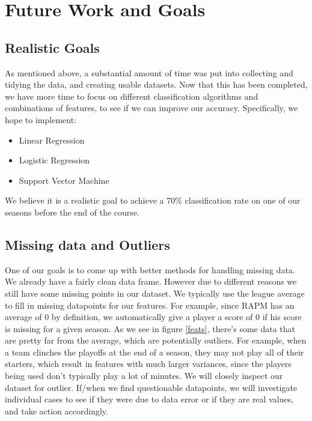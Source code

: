 \documentclass{article}
\begin{document}
\section{Future Work and Goals}

	\subsection{Realistic Goals}
	As mentioned above, a substantial amount of time was put into collecting and tidying the data, and creating usable datasets. Now that this has been completed, we have more time to focus on different classification algorithms and combinations of features, to see if we can improve our accuracy. Specifically, we hope to implement:

	\begin{itemize}
		\item Linear Regression
		\item Logistic Regression
		\item Support Vector Machine
	\end{itemize}

	We believe it is a realistic goal to achieve a 70\% classification rate on one of our seasons before the end of the course. 

	\subsection{Missing data and Outliers}
	One of our goals is to come up with better methods for handling missing data. We already have a fairly clean data frame. However due to different reasons we still have some missing points in our dataset. We typically use the league average to fill in missing datapoints for our features. For example, since RAPM has an average of 0 by definition, we automatically give a player a score of 0 if his score is missing for a given season. As we see in figure \ref{feats}, there's some data that are pretty far from the average, which are potentially outliers. For example, when a team clinches the playoffs at the end of a season, they may not play all of their starters, which result in features with much larger variances, since the players being used don't typically play a lot of minutes. We will closely inspect our dataset for outlier. If/when we find questionable datapoints, we will investigate individual cases to see if they were due to data error or if they are real values, and take action accordingly. 
\end{document}
